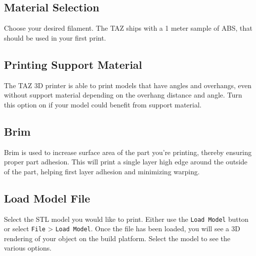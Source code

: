 \subsection{Material Selection}
Choose your desired filament. The TAZ ships with a 1 meter sample of ABS, that should be used in your first print.

\subsection{Printing Support Material}
The TAZ 3D printer is able to print models that have angles and overhangs, even without support material depending on the overhang distance and angle. Turn this option on if your model could benefit from support material.

\subsection{Brim}
Brim is used to increase surface area of the part you're printing, thereby ensuring proper part adhesion. This will print a single layer high edge around the outside of the part, helping first layer adhesion and minimizing warping.

\subsection{Load Model File}
Select the STL model you would like to print. Either use the \texttt{Load Model} button or select \texttt{File} > \texttt{Load Model}. Once the file has been loaded, you will see a 3D rendering of your object on the build platform. Select the model to see the various options. 

